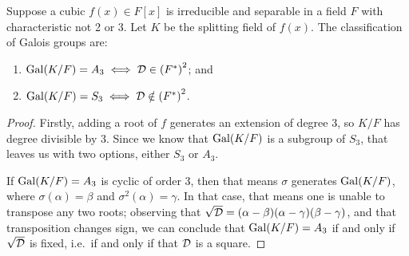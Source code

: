 \begin{theorem}\label{thm:galois-group-cubic}
    Suppose a cubic \(f(x) \in F[x]\) is irreducible and separable
    in a field \(F\) with characteristic not 2 or 3.
    Let \(K\) be the splitting field of \(f(x)\).
    The classification of Galois groups are:
    \begin{enumerate}[label={(\alph*)}, itemsep=0mm]
        \item \(\operatorname{Gal}(K/F) = A_3 \iff \mathcal{D} \in {(F^\ast)}^2\); and
        \item \(\operatorname{Gal}(K/F) = S_3 \iff \mathcal{D} \notin {(F^\ast)}^2\).
    \end{enumerate}
\end{theorem}
\begin{proof}
    Firstly, adding a root of \(f\) generates an extension of degree 3,
    so \(K/F\) has degree divisible by 3.
    Since we know that \(\operatorname{Gal}(K/F)\) is a subgroup of \(S_3\),
    that leaves us with two options, either \(S_3\) or \(A_3\).

    If \(\operatorname{Gal}(K/F) = A_3\) is cyclic of order 3, then that means \(\sigma\) generates \(\operatorname{Gal}(K/F)\),
    where \(\sigma(\alpha) = \beta\) and \(\sigma^2(\alpha) = \gamma\).
    In that case, that means one is unable to transpose any two roots;
    observing that \(\sqrt{\mathcal{D}} = (\alpha-\beta)(\alpha-\gamma)(\beta-\gamma)\),
    and that transposition changes sign,
    we can conclude that \(\operatorname{Gal}(K/F) = A_3\) if and only if \(\sqrt{\mathcal{D}}\) is fixed,
    i.e.\ if and only if that \(\mathcal{D}\) is a square.
\end{proof}

